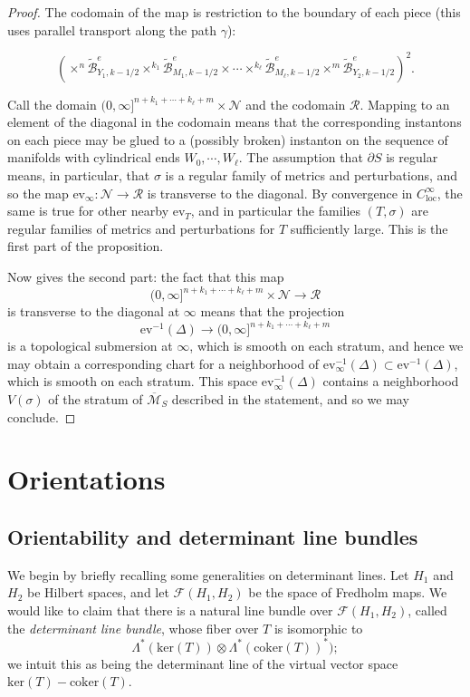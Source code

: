 \documentclass{memo-l}
\theoremstyle{definition}
\theoremstyle{remark}
\numberwithin{section}{chapter}
\numberwithin{equation}{chapter}
\begin{document}
\begin{proof}
The codomain of the map is restriction to the boundary of each piece (this uses parallel transport along the path $\gamma$):

$$\left(\times^n \widetilde{\mathcal B}^e_{Y_1, k-1/2} \times^{k_1} \widetilde{\mathcal B}^e_{M_1, k-1/2} \times \cdots \times^{k_\ell} \widetilde{\mathcal B}^e_{M_\ell, k-1/2} \times^m \widetilde{\mathcal B}^e_{Y_2,k-1/2}\right)^2.$$

Call the  domain $(0, \infty]^{n+k_1 + \cdots + k_\ell + m} \times \mathcal N$ and the codomain $\mathcal R$. Mapping to an element of the diagonal in the codomain means that the corresponding instantons on each piece may be glued to a (possibly broken) instanton on the sequence of manifolds with cylindrical ends $W_0, \cdots, W_\ell$. The assumption that $\partial S$ is regular means, in particular, that $\sigma$ is a regular family of metrics and perturbations, and so the map $\text{ev}_\infty: \mathcal N \to \mathcal R$ is transverse to the diagonal. By convergence in $C^\infty_{\text{loc}}$, the same is true for other nearby $\text{ev}_T$, and in particular the families $(T, \sigma)$ are regular families of metrics and perturbations for $T$ sufficiently large. This is the first part of the proposition.

Now \cite[Lemma~19.3.3]{KMSW} gives the second part: the fact that this map $$(0, \infty]^{n+k_1 + \cdots + k_\ell + m} \times \mathcal N \to \mathcal R$$ is transverse to the diagonal at $\infty$ means that the projection $$\text{ev}^{-1}(\Delta) \to (0, \infty]^{n+k_1 + \cdots + k_\ell + m}$$ is a topological submersion at $\infty$, which is smooth on each stratum, and hence we may obtain a corresponding chart for a neighborhood of $\text{ev}_\infty^{-1}(\Delta) \subset \text{ev}^{-1}(\Delta)$, which is smooth on each stratum. This space $\text{ev}_\infty^{-1}(\Delta)$ contains a neighborhood $V(\sigma)$ of the stratum of $\overline{\mathcal M}_S$ described in the statement, and so we may conclude.
\end{proof}

\chapter{Orientations}\label{chap:5}
\section{Orientability and determinant line bundles}\label{sec:or-detlines}
We begin by briefly recalling some generalities on determinant lines. Let $H_1$ and $H_2$ be Hilbert spaces, and let $\mathcal F(H_1, H_2)$ be the space of Fredholm maps. We would like to claim that there is a natural line bundle over $\mathcal F(H_1, H_2)$, called the \textit{determinant line bundle}, whose fiber over $T$ is isomorphic to 
$$\Lambda^*(\text{ker}(T)) \otimes \Lambda^*(\text{coker}(T))^*);$$ 
we intuit this as being the determinant line of the virtual vector space $\text{ker}(T) - \text{coker}(T)$.
\end{document}
